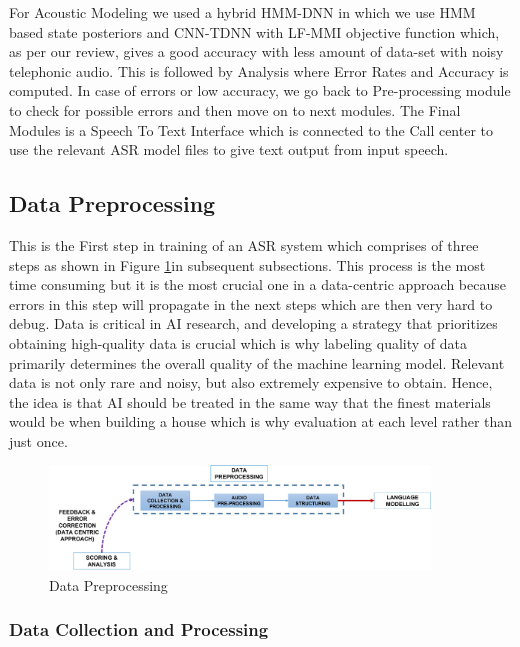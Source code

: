 \documentclass[a4paper, 11pt]{article}
\begin{document}
For Acoustic Modeling we used a hybrid HMM-DNN in which we use HMM based state posteriors and CNN-TDNN with LF-MMI objective function which, as per our review, gives a good accuracy with less amount of data-set with noisy telephonic audio. This is followed by Analysis where Error Rates and Accuracy is computed. In case of errors or low accuracy, we go back to Pre-processing module to check for possible errors and then move on to next modules. The Final Modules is a Speech To Text Interface which is connected to the Call center to use the relevant ASR model files to give text output from input speech. 




\subsection{Data Pre\-processing}

This is the First step in training of an ASR system which comprises of three steps as shown in Figure \ref{fig:working_pipeline-1}in subsequent subsections. This process is the most time consuming but it is the most crucial one in a data-centric approach because errors in this step will propagate in the next steps which are then very hard to debug. Data is critical in AI research, and developing a strategy that prioritizes obtaining high-quality data is crucial which is why labeling quality of data primarily determines the overall quality of the machine learning model. Relevant data is not only rare and noisy, but also extremely expensive to obtain. Hence, the idea is that AI should be treated in the same way that the finest materials would be when building a house which is why evaluation at each level rather than just once. 

\begin{figure}[h]
    \centering
    \includegraphics[width=0.9\textwidth]{img/workflow-1.png}
    \caption{Data Pre\-processing}
    \label{fig:working_pipeline-1}
\end{figure}

\subsubsection{Data Collection and Processing}
\label{sec:Data_preprocessing}
\end{document}
